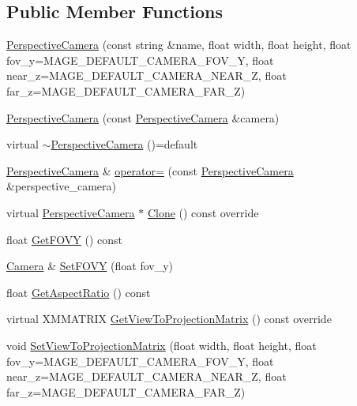 \subsection*{Public Member Functions}
\begin{DoxyCompactItemize}
\item 
\hyperlink{classmage_1_1_perspective_camera_a1e0d1c4d57812b9629ab38b69bc2ce6b}{Perspective\+Camera} (const string \&name, float width, float height, float fov\+\_\+y=M\+A\+G\+E\+\_\+\+D\+E\+F\+A\+U\+L\+T\+\_\+\+C\+A\+M\+E\+R\+A\+\_\+\+F\+O\+V\+\_\+Y, float near\+\_\+z=M\+A\+G\+E\+\_\+\+D\+E\+F\+A\+U\+L\+T\+\_\+\+C\+A\+M\+E\+R\+A\+\_\+\+N\+E\+A\+R\+\_\+Z, float far\+\_\+z=M\+A\+G\+E\+\_\+\+D\+E\+F\+A\+U\+L\+T\+\_\+\+C\+A\+M\+E\+R\+A\+\_\+\+F\+A\+R\+\_\+Z)
\item 
\hyperlink{classmage_1_1_perspective_camera_a198d1460d9312af27ed6ef2ac28b616d}{Perspective\+Camera} (const \hyperlink{classmage_1_1_perspective_camera}{Perspective\+Camera} \&camera)
\item 
virtual \hyperlink{classmage_1_1_perspective_camera_a119a77c3f14072040231845e9a894af2}{$\sim$\+Perspective\+Camera} ()=default
\item 
\hyperlink{classmage_1_1_perspective_camera}{Perspective\+Camera} \& \hyperlink{classmage_1_1_perspective_camera_ac4c9ab3a10fac363e6779570c4905d65}{operator=} (const \hyperlink{classmage_1_1_perspective_camera}{Perspective\+Camera} \&perspective\+\_\+camera)
\item 
virtual \hyperlink{classmage_1_1_perspective_camera}{Perspective\+Camera} $\ast$ \hyperlink{classmage_1_1_perspective_camera_a08eebf7f3ba10a46b4b23c0ded1192f2}{Clone} () const override
\item 
float \hyperlink{classmage_1_1_perspective_camera_a15223034b30ca691c51de8850c033293}{Get\+F\+O\+VY} () const
\item 
\hyperlink{classmage_1_1_camera}{Camera} \& \hyperlink{classmage_1_1_perspective_camera_a00033fc6b25206c40a056ce142fecfee}{Set\+F\+O\+VY} (float fov\+\_\+y)
\item 
float \hyperlink{classmage_1_1_perspective_camera_ab74cbd2777d5b430da5702a12b1b451e}{Get\+Aspect\+Ratio} () const
\item 
virtual X\+M\+M\+A\+T\+R\+IX \hyperlink{classmage_1_1_perspective_camera_a83a38a4e8180707df2323130f9cee4a5}{Get\+View\+To\+Projection\+Matrix} () const override
\item 
void \hyperlink{classmage_1_1_perspective_camera_adef65223ab45c65cebf712dd14cea942}{Set\+View\+To\+Projection\+Matrix} (float width, float height, float fov\+\_\+y=M\+A\+G\+E\+\_\+\+D\+E\+F\+A\+U\+L\+T\+\_\+\+C\+A\+M\+E\+R\+A\+\_\+\+F\+O\+V\+\_\+Y, float near\+\_\+z=M\+A\+G\+E\+\_\+\+D\+E\+F\+A\+U\+L\+T\+\_\+\+C\+A\+M\+E\+R\+A\+\_\+\+N\+E\+A\+R\+\_\+Z, float far\+\_\+z=M\+A\+G\+E\+\_\+\+D\+E\+F\+A\+U\+L\+T\+\_\+\+C\+A\+M\+E\+R\+A\+\_\+\+F\+A\+R\+\_\+Z)
\end{DoxyCompactItemize}
